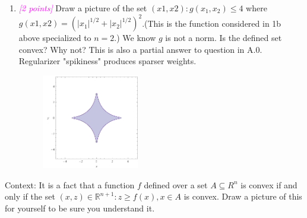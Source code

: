 \documentclass{article}
\newcommand{\field}[1]{\mathbb{#1}}
\newcommand{\1}{\mathbf{1}}
\newcommand{\R}{\field{R}} %
\newcommand{\points}[1]{\small\textcolor{magenta}{\emph{[#1 points]}} \normalsize}
\begin{document}
\begin{enumerate}
    
    \item \points{2} Draw a picture of the set ${(x1,x2) : g(x_1,x_2)\leq 4}$ where $g(x1,x2) =(|x_1|^{1/2} + |x_2|^{1/2})^2$.(This is the function considered in 1b above specialized to $n=2$.)  We know $g$ is not a norm. Is the defined set convex? Why not?
    This is also a partial answer to question in A.0. Regularizer "spikiness" produces sparser weights. 
    \begin{figure}
        \centering
        \includegraphics[width=0.4\textwidth]{HW2/HW2_plots/convexSetPlot.png}
    \end{figure}{}
    
\end{enumerate} 

Context:  It is a fact that a function $f$ defined over a set $A\subseteq R^n$ is convex if and only if the set ${(x,z)\in\R^{n+1}:z\geq f(x), x\in A}$ is convex.  Draw a picture of this for yourself to be sure you understand it.
\end{document}
